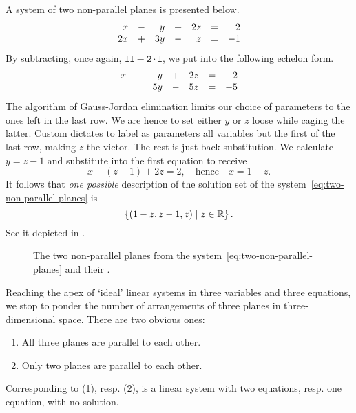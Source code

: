 A system of two non-parallel planes is presented below.
\begin{equation}
 \label{eq:two-non-parallel-planes}
 \begin{array}{r c r c r c r}
  x & - & y & + & 2z & = & 2\\
  2x & + & 3y & - & z & = & -1
 \end{array}
\end{equation}
By subtracting, once again, $\mathtt{II - 2 \cdot I}$, we put into the following
echelon form.
\[
 \begin{array}{r c r c r c r}
  x & - & y & + & 2z & = & 2\\
    &   & 5y & - & 5z & = & -5
 \end{array}
\]
The algorithm of Gauss-Jordan elimination limits our choice of parameters to the
ones left in the last row. We are hence to set either $y$ or $z$ loose while
caging the latter. Custom dictates to label as parameters all variables but the
first of the last row, making $z$ the victor. The rest is just
back-substitution. We calculate $y = z - 1$ and substitute into the first
equation to receive
\[
 x - (z - 1) + 2z = 2, \quad \text{hence} \quad x = 1 - z.
\]
It follows that \emph{one possible} description of the solution set of the
system~\eqref{eq:two-non-parallel-planes} is
\[
 \left\{ (1 - z, z - 1, z) \mid z \in \mathbb{R}\right\}.
\]
See it depicted in .
\begin{figure}[ht]
 \centering

 \caption{The two non-parallel planes from the
 system~\eqref{eq:two-non-parallel-planes} and their .}
 \label{fig:two-non-parallel-planes}
\end{figure}

Reaching the apex of `ideal' linear systems in three variables and three
equations, we stop to ponder the number of arrangements of three planes in
three-dimensional space. There are two obvious ones:
\begin{enumerate}
 \item All three planes are parallel to each other.
 \item Only two planes are parallel to each other.
\end{enumerate}
Corresponding to (1), resp. (2), is a linear system with two equations, resp.
one equation, with no solution.

